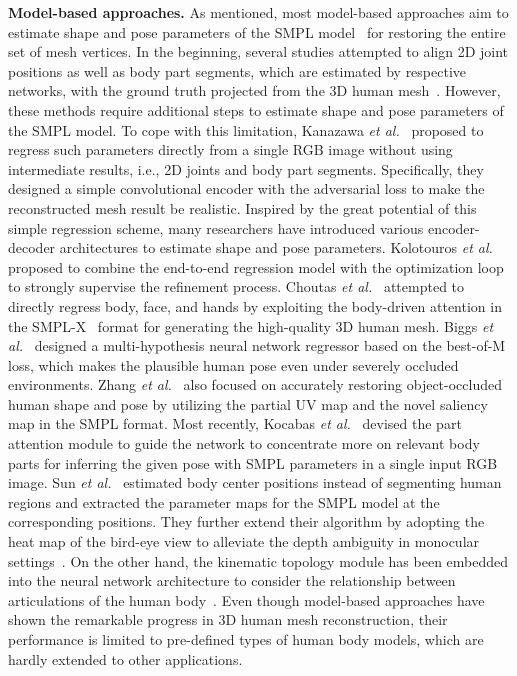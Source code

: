 \documentclass[10pt,twocolumn,letterpaper]{article}
\begin{document}
\vspace{1mm}
\noindent\textbf{Model-based approaches.} As mentioned, most model-based approaches aim to estimate shape and pose parameters of the SMPL model~\cite{Loper15} for restoring the entire set of mesh vertices. In the beginning, several studies attempted to align 2D joint positions as well as body part segments, which are estimated by respective networks, with the ground truth projected from the 3D human mesh~\cite{Bogo16,Lassner17}. However, these methods require additional steps to estimate shape and pose parameters of the SMPL model. To cope with this limitation, Kanazawa {\it et al.}~\cite{Kanazawa18} proposed to regress such parameters directly from a single RGB image without using intermediate results, i.e., 2D joints and body part segments. Specifically, they designed a simple convolutional encoder with the adversarial loss to make the reconstructed mesh result be realistic. Inspired by the great potential of this simple regression scheme, many researchers have introduced various encoder-decoder architectures to estimate shape and pose parameters. Kolotouros {\it et al.}~\cite{Kolotouros19_ICCV} proposed to combine the end-to-end regression model with the optimization loop to strongly supervise the refinement process. Choutas {\it et al.}~\cite{Choutas20} attempted to directly regress body, face, and hands by exploiting the body-driven attention in the SMPL-X~\cite{Pavlakos19} format for generating the high-quality 3D human mesh. Biggs {\it et al.}~\cite{Biggs20} designed a multi-hypothesis neural network regressor based on the best-of-M loss, which makes the plausible human pose even under severely occluded environments. Zhang {\it et al.}~\cite{Zhang20} also focused on accurately restoring object-occluded human shape and pose by utilizing the partial UV map and the novel saliency map in the SMPL format. Most recently, Kocabas {\it et al.}~\cite{Kocabas21} devised the part attention module to guide the network to concentrate more on relevant body parts for inferring the given pose with SMPL parameters in a single input RGB image. Sun {\it et al.}~\cite{Sun21} estimated body center positions instead of segmenting human regions and extracted the parameter maps for the SMPL model at the corresponding positions. They further extend their algorithm by adopting the heat map of the bird-eye view to alleviate the depth ambiguity in monocular settings~\cite{Sun22}. On the other hand, the kinematic topology module has been embedded into the neural network architecture to consider the relationship between articulations of the human body~\cite{Li21}. Even though model-based approaches have shown the remarkable progress in 3D human mesh reconstruction, their performance is limited to pre-defined types of human body models, which are hardly extended to other applications.
\end{document}

